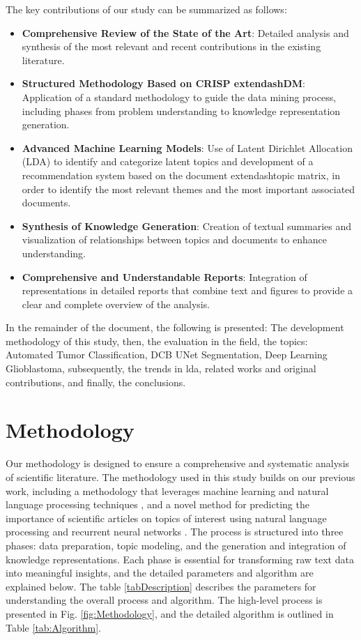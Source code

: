 \documentclass[runningheads]{llncs}
\begin{document}
The key contributions of our study can be summarized as follows: 

\begin{itemize}
    \item \textbf{Comprehensive Review of the State of the Art}: Detailed analysis and synthesis of the most relevant and recent contributions in the existing literature.
    \item \textbf{Structured Methodology Based on CRISP	extendash{}DM}: Application of a standard methodology to guide the data mining process, including phases from problem understanding to knowledge representation generation.
    \item \textbf{Advanced Machine Learning Models}: Use of Latent Dirichlet Allocation (LDA) to identify and categorize latent topics and development of a recommendation system based on the document	extendash{}topic matrix, in order to identify the most relevant themes and the most important associated documents.
    \item \textbf{Synthesis of Knowledge Generation}: Creation of textual summaries and visualization of relationships between topics and documents to enhance understanding.
    \item \textbf{Comprehensive and Understandable Reports}: Integration of representations in detailed reports that combine text and figures to provide a clear and complete overview of the analysis.
\end{itemize}

In the remainder of the document, the following is presented: The development methodology of this study, then, the evaluation in the field, the topics: Automated Tumor Classification, DCB UNet Segmentation, Deep Learning Glioblastoma,  subsequently, the trends in lda, related works and original contributions, and finally, the conclusions.
\section{Methodology}

Our methodology is designed to ensure a comprehensive and systematic analysis of scientific literature. The methodology used in this study builds on our previous work, including a methodology that leverages machine learning and natural language processing techniques \cite{Hurtado2023}, and a novel method for predicting the importance of scientific articles on topics of interest using natural language processing and recurrent neural networks \cite{Lopez2024}. The process is structured into three phases: data preparation, topic modeling, and the generation and integration of knowledge representations. Each phase is essential for transforming raw text data into meaningful insights, and the detailed parameters and algorithm are explained below. The table \ref{tabDescription} describes the parameters for understanding the overall process and algorithm. The high-level process is presented in Fig. \ref{fig:Methodology}, and the detailed algorithm is outlined in Table \ref{tab:Algorithm}.\\ 
\end{document}
